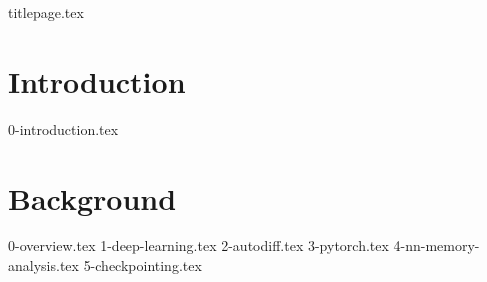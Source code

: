 \documentclass[12pt,twoside]{report}
\begin{document}
{titlepage.tex}


\clearpage{\pagestyle{empty}\cleardoublepage}

\pagestyle{fancy}

\setcounter{page}{1}

\begin{abstract}
{0-abstract.tex}
\end{abstract}

\clearpage{\pagestyle{empty}\cleardoublepage}



\tableofcontents
\clearpage{\pagestyle{empty}}

\listoffigures
\clearpage{\pagestyle{empty}}

\listoflistings
\clearpage{\pagestyle{empty}}

\listofalgorithms

\clearpage{\pagestyle{empty}\cleardoublepage}


\setcounter{page}{1}
\fancyhead[LE,RO]{\slshape \rightmark}
\fancyhead[LO,RE]{\slshape \leftmark}

\chapter{Introduction}
{0-introduction.tex}

\chapter{Background}
{0-overview.tex}
{1-deep-learning.tex}
{2-autodiff.tex}
{3-pytorch.tex}
{4-nn-memory-analysis.tex}
{5-checkpointing.tex}
\end{document}

